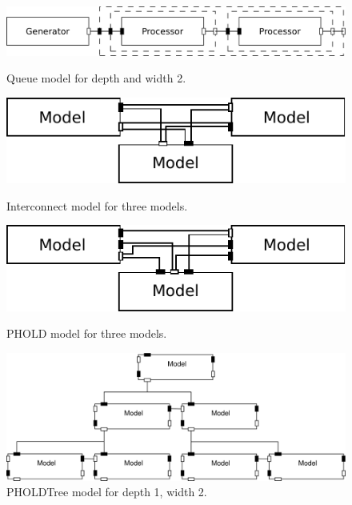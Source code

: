 \begin{figure}
	\center
	\includegraphics[width=\columnwidth]{fig/queue_model_fixed.pdf}
	\caption{Queue model for depth and width 2.}
	\label{fig:queue_model}
	
	\vspace{\betweenmodels}
	
	\includegraphics[width=\modelfraction\columnwidth]{fig/interconnect_model.pdf}
	\caption{Interconnect model for three models.}
	\label{fig:interconnect_model}
	
	\vspace{\betweenmodels}
	
	\includegraphics[width=\modelfraction\columnwidth]{fig/phold_model.pdf}
	\caption{PHOLD model for three models.}
	\label{fig:PHOLD_model}
	
	\includegraphics[width=\modelfraction\columnwidth]{fig/pholdtree.pdf}
	\caption{PHOLDTree model for depth 1, width 2.}
	\label{fig:PHOLDTree_model}
\end{figure}
